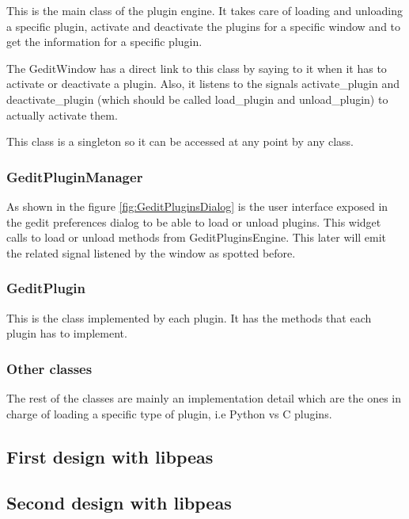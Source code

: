 This is the main class of the plugin engine. It takes care of loading and unloading a specific plugin, activate and deactivate the plugins for a specific window and to get the information for a specific plugin.

The GeditWindow has a direct link to this class by saying to it when it has to activate or deactivate a plugin. Also, it listens to the signals activate\_plugin and deactivate\_plugin (which should be called load\_plugin and unload\_plugin) to actually activate them.

This class is a singleton so it can be accessed at any point by any class.

\newpage
\subsubsection{GeditPluginManager}


As shown in the figure \ref{fig:GeditPluginsDialog} is the user interface exposed in the gedit preferences dialog to be able to load or unload plugins. This widget calls to load or unload methods from GeditPluginsEngine. This later will emit the related signal listened by the window as spotted before.

\subsubsection{GeditPlugin}

This is the class implemented by each plugin. It has the methods that each plugin has to implement.

\subsubsection{Other classes}

The rest of the classes are mainly an implementation detail which are the ones in charge of loading a specific type of plugin, i.e Python vs C plugins.

\newpage
\subsection{First design with libpeas}


\subsection{Second design with libpeas}

